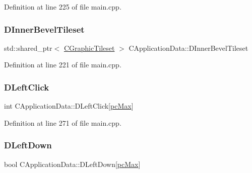 Definition at line 225 of file main.\+cpp.

\hypertarget{classCApplicationData_ae62d58d93397422437d8f50acfca23e6}{}\label{classCApplicationData_ae62d58d93397422437d8f50acfca23e6} 
\subsubsection{\texorpdfstring{D\+Inner\+Bevel\+Tileset}{DInnerBevelTileset}}
{\footnotesize\ttfamily std\+::shared\+\_\+ptr$<$ \hyperlink{classCGraphicTileset}{C\+Graphic\+Tileset} $>$ C\+Application\+Data\+::\+D\+Inner\+Bevel\+Tileset\hspace{0.3cm}{\ttfamily [protected]}}



Definition at line 221 of file main.\+cpp.

\hypertarget{classCApplicationData_a8a86bb4c7cba7b119121401dda4ca68b}{}\label{classCApplicationData_a8a86bb4c7cba7b119121401dda4ca68b} 
\subsubsection{\texorpdfstring{D\+Left\+Click}{DLeftClick}}
{\footnotesize\ttfamily int C\+Application\+Data\+::\+D\+Left\+Click\mbox{[}\hyperlink{GameDataTypes_8h_aafb0ca75933357ff28a6d7efbdd7602fa594a5c8dd3987f24e8a0f23f1a72cd34}{pc\+Max}\mbox{]}\hspace{0.3cm}{\ttfamily [protected]}}



Definition at line 271 of file main.\+cpp.

\hypertarget{classCApplicationData_a2b943f18557c3e4c8cd4550e22e028b6}{}\label{classCApplicationData_a2b943f18557c3e4c8cd4550e22e028b6} 
\subsubsection{\texorpdfstring{D\+Left\+Down}{DLeftDown}}
{\footnotesize\ttfamily bool C\+Application\+Data\+::\+D\+Left\+Down\mbox{[}\hyperlink{GameDataTypes_8h_aafb0ca75933357ff28a6d7efbdd7602fa594a5c8dd3987f24e8a0f23f1a72cd34}{pc\+Max}\mbox{]}\hspace{0.3cm}{\ttfamily [protected]}}



